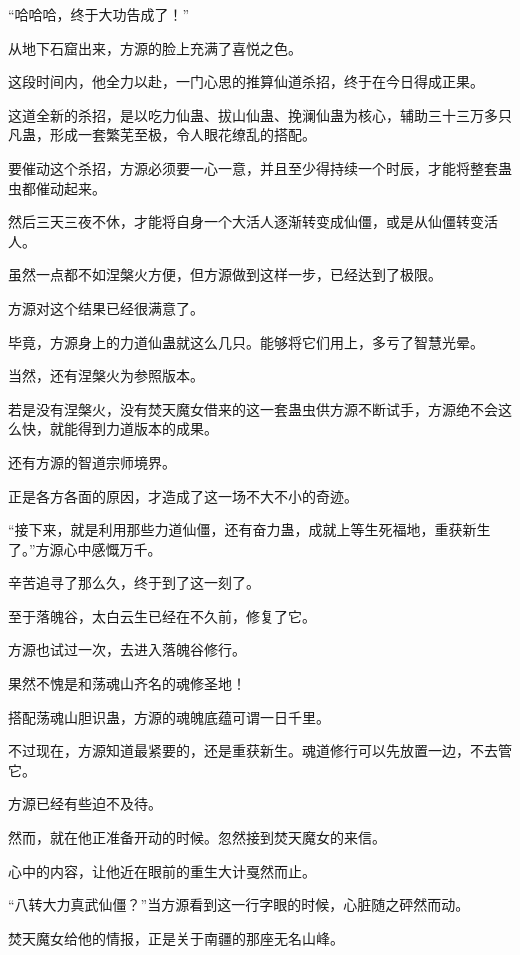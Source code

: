 
\begin{this_body}

“哈哈哈，终于大功告成了！”

从地下石窟出来，方源的脸上充满了喜悦之色。

这段时间内，他全力以赴，一门心思的推算仙道杀招，终于在今日得成正果。

这道全新的杀招，是以吃力仙蛊、拔山仙蛊、挽澜仙蛊为核心，辅助三十三万多只凡蛊，形成一套繁芜至极，令人眼花缭乱的搭配。

要催动这个杀招，方源必须要一心一意，并且至少得持续一个时辰，才能将整套蛊虫都催动起来。

然后三天三夜不休，才能将自身一个大活人逐渐转变成仙僵，或是从仙僵转变活人。

虽然一点都不如涅槃火方便，但方源做到这样一步，已经达到了极限。

方源对这个结果已经很满意了。

毕竟，方源身上的力道仙蛊就这么几只。能够将它们用上，多亏了智慧光晕。

当然，还有涅槃火为参照版本。

若是没有涅槃火，没有焚天魔女借来的这一套蛊虫供方源不断试手，方源绝不会这么快，就能得到力道版本的成果。

还有方源的智道宗师境界。

正是各方各面的原因，才造成了这一场不大不小的奇迹。

“接下来，就是利用那些力道仙僵，还有奋力蛊，成就上等生死福地，重获新生了。”方源心中感慨万千。

辛苦追寻了那么久，终于到了这一刻了。

至于落魄谷，太白云生已经在不久前，修复了它。

方源也试过一次，去进入落魄谷修行。

果然不愧是和荡魂山齐名的魂修圣地！

搭配荡魂山胆识蛊，方源的魂魄底蕴可谓一日千里。

不过现在，方源知道最紧要的，还是重获新生。魂道修行可以先放置一边，不去管它。

方源已经有些迫不及待。

然而，就在他正准备开动的时候。忽然接到焚天魔女的来信。

心中的内容，让他近在眼前的重生大计戛然而止。

“八转大力真武仙僵？”当方源看到这一行字眼的时候，心脏随之砰然而动。

焚天魔女给他的情报，正是关于南疆的那座无名山峰。


\end{this_body}
